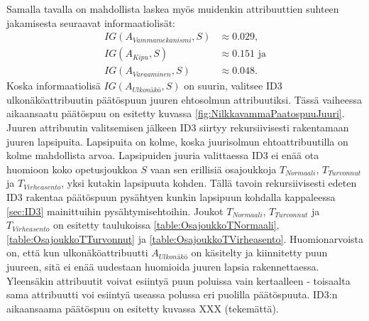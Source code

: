 \documentclass[12pt,finnish]{tktltiki2}
\theoremstyle{definition}
\theoremstyle{remark}
\begin{document}
Samalla tavalla on mahdollista laskea myös muidenkin attribuuttien suhteen jakamisesta seuraavat informaatiolisät:
\begin{equation*}
\begin{split}
IG(A_{Vammamekanismi},S) &\approx 0.029 \mbox{,}\\
IG(A_{Kipu},S) &\approx 0.151 \mbox{ ja}\\
IG(A_{Varaaminen},S) &\approx 0.048 \mbox{.}
\end{split}
\end{equation*}
Koska informaatiolisä $IG(A_{Ulkonäkö},S)$ on suurin, valitsee ID3 ulkonäköattribuutin päätöspuun juuren ehtosolmun attribuutiksi.
Tässä vaiheessa aikaansaatu päätöspuu on esitetty kuvassa \ref{fig:NilkkavammaPaatospuuJuuri}. Juuren attribuutin valitsemisen
jälkeen ID3 siirtyy rekursiivisesti rakentamaan juuren lapsipuita. Lapsipuita on kolme, koska juurisolmun ehtoattribuutilla
on kolme mahdollista arvoa. Lapsipuiden juuria valittaessa ID3 ei enää ota huomioon koko opetusjoukkoa $S$ vaan sen
erillisiä osajoukkoja $T_{Normaali}$, $T_{Turvonnut}$ ja $T_{Virheasento}$, yksi kutakin lapsipuuta kohden. Tällä tavoin
rekursiivisesti edeten ID3 rakentaa päätöspuun pysähtyen kunkin lapsipuun kohdalla kappaleessa \ref{sec:ID3}
mainittuihin pysähtymisehtoihin. Joukot $T_{Normaali}$, $T_{Turvonnut}$ ja $T_{Virheasento}$ on esitetty taulukoissa
\ref{table:OsajoukkoTNormaali}, \ref{table:OsajoukkoTTurvonnut} ja \ref{table:OsajoukkoTVirheasento}.
Huomionarvoista on, että kun ulkonäköattribuutti $A_{Ulkonäkö}$ on käsitelty ja kiinnitetty puun juureen, sitä ei enää
uudestaan huomioida juuren lapsia rakennettaessa. Yleensäkin attribuutit voivat esiintyä puun poluissa vain kertaalleen -
toisaalta sama attribuutti voi esiintyä useassa polussa eri puolilla päätöspuuta.
ID3:n aikaansaama päätöspuu on esitetty kuvassa XXX (tekemättä).
\end{document}
